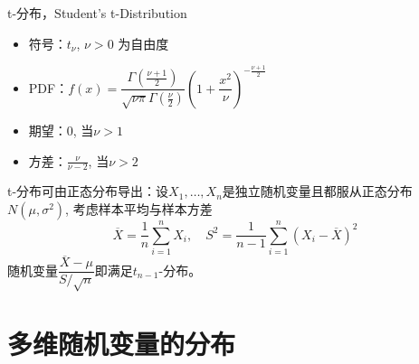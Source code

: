 
\begin{frame}

\begin{block}{t-分布，Student's t-Distribution}
\begin{itemize}
\item 符号：$t_{\nu}$, \; $\nu > 0$ 为自由度
\item PDF：$f(x) = \dfrac{\Gamma(\frac{\nu+1}{2})}{\sqrt{\nu\pi}\Gamma(\frac{\nu}{2})} \left( 1 + \dfrac{x^2}{\nu} \right)^{-\frac{\nu+1}{2}}$
\item 期望：$0$, 当$\nu > 1$
\item 方差：$\frac{\nu}{\nu-2}$, 当$\nu > 2$
\end{itemize}
\end{block}

\pause

t-分布可由正态分布导出：设$X_1,\ldots,X_n$是独立随机变量且都服从正态分布$N(\mu, \sigma^2)$, 考虑样本平均与样本方差
\[\overline{X} = \dfrac{1}{n}\sum\limits_{i=1}^n X_i, \quad S^2 = \dfrac{1}{n-1}\sum\limits_{i=1}^n (X_i-\overline{X})^2\]
随机变量$\dfrac{\overline{X} - \mu}{S/\sqrt{n}}$即满足$t_{n-1}$-分布。

\end{frame}








\section{多维随机变量的分布}

